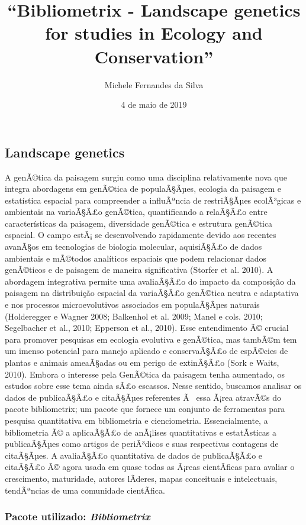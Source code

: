 \documentclass[]{article}
\title{``Bibliometrix - Landscape genetics for studies in Ecology and
Conservation''}
\author{Michele Fernandes da Silva}
\date{4 de maio de 2019}
\begin{document}
\maketitle

\subsection{\texorpdfstring{\textbf{Landscape
genetics}}{Landscape genetics}}\label{landscape-genetics}

A genÃ©tica da paisagem surgiu como uma disciplina relativamente nova
que integra abordagens em genÃ©tica de populaÃ§Ãµes, ecologia da
paisagem e estatística espacial para compreender a influÃªncia de
restriÃ§Ãµes ecolÃ³gicas e ambientais na variaÃ§Ã£o genÃ©tica,
quantificando a relaÃ§Ã£o entre características da paisagem, diversidade
genÃ©tica e estrutura genÃ©tica espacial. O campo estÃ¡ se desenvolvendo
rapidamente devido aos recentes avanÃ§os em tecnologias de biologia
molecular, aquisiÃ§Ã£o de dados ambientais e mÃ©todos analíticos
espaciais que podem relacionar dados genÃ©ticos e de paisagem de maneira
significativa (Storfer et al. 2010). A abordagem integrativa permite uma
avaliaÃ§Ã£o do impacto da composição da paisagem na distribuição
espacial da variaÃ§Ã£o genÃ©tica neutra e adaptativa e nos processos
microevolutivos associados em populaÃ§Ãµes naturais (Holderegger e
Wagner 2008; Balkenhol et al. 2009; Manel e cols. 2010; Segelbacher et
al., 2010; Epperson et al., 2010). Esse entendimento Ã© crucial para
promover pesquisas em ecologia evolutiva e genÃ©tica, mas tambÃ©m tem um
imenso potencial para manejo aplicado e conservaÃ§Ã£o de espÃ©cies de
plantas e animais ameaÃ§adas ou em perigo de extinÃ§Ã£o (Sork e Waits,
2010). Embora o interesse pela GenÃ©tica da paisagem tenha aumentado, os
estudos sobre esse tema ainda sÃ£o escassos. Nesse sentido, buscamos
analisar os dados de publicaÃ§Ã£o e citaÃ§Ãµes referentes Ã~ essa Ã¡rea
atravÃ©s do pacote bibliometrix; um pacote que fornece um conjunto de
ferramentas para pesquisa quantitativa em bibliometria e cienciometria.
Essencialmente, a bibliometria Ã© a aplicaÃ§Ã£o de anÃ¡lises
quantitativas e estatÃ­sticas a publicaÃ§Ãµes como artigos de
periÃ³dicos e suas respectivas contagens de citaÃ§Ãµes. A avaliaÃ§Ã£o
quantitativa de dados de publicaÃ§Ã£o e citaÃ§Ã£o Ã© agora usada em
quase todas as Ã¡reas cientÃ­ficas para avaliar o crescimento,
maturidade, autores lÃ­deres, mapas conceituais e intelectuais,
tendÃªncias de uma comunidade cientÃ­fica.

\subsubsection{\texorpdfstring{Pacote utilizado:
\emph{Bibliometrix}}{Pacote utilizado: Bibliometrix}}\label{pacote-utilizado-bibliometrix}
\end{document}
